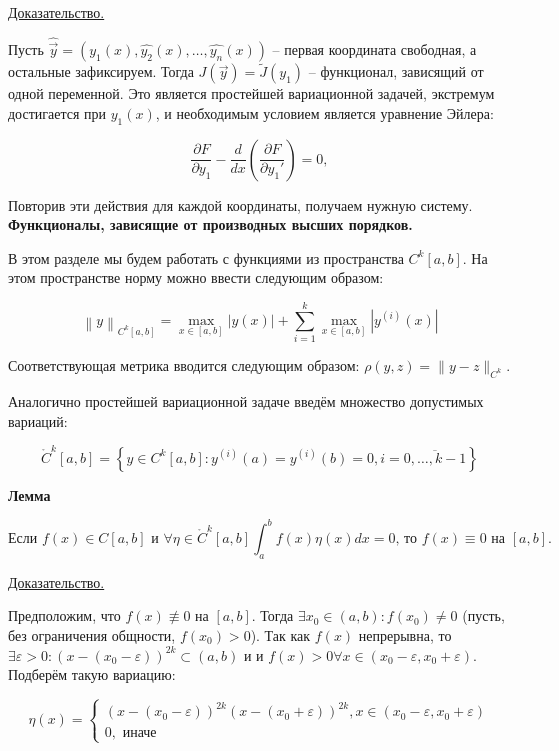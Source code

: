 \underline{Доказательство.}

Пусть $\widehat{\Vec{y}} = 
\left( y_1(x), \widehat{y_2}(x), \dots, \widehat{y_n}(x) \right)$ --
первая координата свободная, а остальные зафиксируем.
Тогда $J(\Vec{y}) = \widetilde{J}(y_1)$ -- функционал, зависящий от
одной переменной. Это является простейшей вариационной задачей,
экстремум достигается при $\widehat{y_1}(x)$, и необходимым условием
является уравнение Эйлера:

$$
\frac{\partial F}{\partial y_1} 
- \frac{d}{dx} \left( \frac{\partial F}{\partial y_1'} \right) = 0,
$$

Повторив эти действия для каждой координаты, получаем нужную систему.
\bigbreak
\textbf{Функционалы, зависящие от производных высших порядков.}

В этом разделе мы будем работать с функциями из пространства
$C^k [a, b]$. На этом пространстве норму можно ввести следующим образом:

$$
\left\| y \right\|_{C^k [a, b]} = 
\max_{x \in [a, b]} |y(x)| + 
\sum_{i = 1}^k \max_{x \in [a, b]} |y^{(i)}(x)|
$$

Соответствующая метрика вводится следующим образом:
$\rho(y, z) = \| y - z \|_{C^k}$.

Аналогично простейшей вариационной задаче 
введём множество допустимых вариаций:

$$
\mathring{C}^k [a, b] = 
\left\{ y \in C^k [a, b] : y^{(i)}(a) = y^{(i)}(b) = 0, 
i = \overline{0, \dots, k - 1} \right\}
$$
\pagebreak

\textbf{Лемма}

$$
\text{Если } f(x) \in C [a, b] \text{ и } 
\forall \eta \in \mathring{C}^k [a, b]
\int_a^b f(x) \eta(x) dx = 0 \text{, то }
f(x) \equiv 0 \text{ на } [a, b].
$$

\underline{Доказательство.}

Предположим, что $f(x) \not \equiv 0$ на $[a, b]$.
Тогда $\exists x_0 \in (a, b) : f(x_0) \neq 0$ (пусть,
без ограничения общности, $f(x_0) > 0$).
Так как $f(x)$ непрерывна, то 
$\exists \varepsilon > 0 : 
\left( x - (x_0 - \varepsilon) \right)^{2k} \subset (a, b)$ и
и $f(x) > 0 \forall x \in (x_0 - \varepsilon, x_0 + \varepsilon)$.
Подберём такую вариацию:

\begin{equation*}
\eta(x) = 
\begin{cases}
\left( x - (x_0 - \varepsilon) \right)^{2k}
\left( x - (x_0 + \varepsilon) \right)^{2k},
x \in (x_0 - \varepsilon, x_0 + \varepsilon)
\\
0, \text{ иначе}
\end{cases}
\end{equation*}

